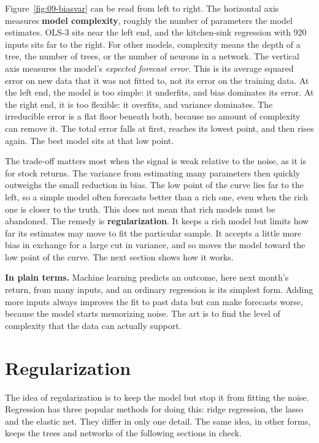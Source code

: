 Figure~\ref{fig:09-biasvar} can be read from left to right. The horizontal axis measures \textbf{model complexity}, roughly the number of parameters the model estimates. OLS-3 sits near the left end, and the kitchen-sink regression with 920 inputs sits far to the right. For other models, complexity means the depth of a tree, the number of trees, or the number of neurons in a network. The vertical axis measures the model's \emph{expected forecast error}. This is its average squared error on new data that it was not fitted to, not its error on the training data. At the left end, the model is too simple: it underfits, and bias dominates its error. At the right end, it is too flexible: it overfits, and variance dominates. The irreducible error is a flat floor beneath both, because no amount of complexity can remove it. The total error falls at first, reaches its lowest point, and then rises again. The best model sits at that low point.

The trade-off matters most when the signal is weak relative to the noise, as it is for stock returns. The variance from estimating many parameters then quickly outweighs the small reduction in bias. The low point of the curve lies far to the left, so a simple model often forecasts better than a rich one, even when the rich one is closer to the truth. This does not mean that rich models must be abandoned. The remedy is \textbf{regularization}. It keeps a rich model but limits how far its estimates may move to fit the particular sample. It accepts a little more bias in exchange for a large cut in variance, and so moves the model toward the low point of the curve. The next section shows how it works.

\noindent\textbf{In plain terms.} Machine learning predicts an outcome, here next month's return, from many inputs, and an ordinary regression is its simplest form. Adding more inputs always improves the fit to past data but can make forecasts worse, because the model starts memorizing noise. The art is to find the level of complexity that the data can actually support.

\section{Regularization}
\label{sec:20-models}
\label{sec:20-shrinkage}

The idea of regularization is to keep the model but stop it from fitting the noise. Regression has three popular methods for doing this: ridge regression, the lasso and the elastic net. They differ in only one detail. The same idea, in other forms, keeps the trees and networks of the following sections in check.

